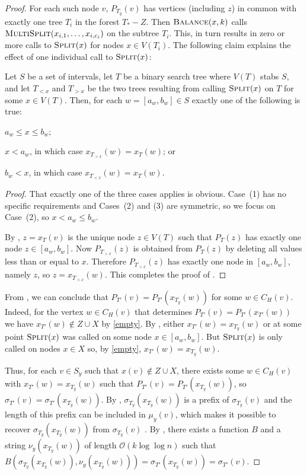 \documentclass[kpfonts]{patmorin}
\newcommand{\Oh}{\mathcal{O}}
\let\le\leqslant
\begin{document}
\begin{proof}
  For each such node $v$, $P_{T_y}(v)$ has vertices (including $z$) in common with exactly one tree $T_{i}$ in the forest $T_*-Z$.  Then $\textsc{Balance}(x,k)$ calls $\textsc{MultiSplit}(x_{i,1},\ldots,x_{i,c_i})$ on the subtree $T_{i}$.  This, in turn results in zero or more calls to $\textsc{Split}(x)$ for nodes $x\in V(T_{i})$. The following claim explains the effect of one individual call to $\textsc{Split}(x)$:

  \begin{clm}
    Let $S$ be a set of intervals, let $T$ be a binary search tree where $V(T)$ stabs $S$, and let $T_{<x}$ and $T_{>x}$ be the two trees resulting from calling $\textsc{Split}(x)$ on $T$ for some $x\in V(T)$.  Then, for each $w=[a_w,b_w]\in S$ exactly one of the following is true:
    \begin{compactenum}
      \item $a_w\le x\le b_w$;
      \item $x< a_w$, in which case $x_{T_{>x}}(w)=x_T(w)$; or
      \item $b_w < x$, in which case $x_{T_{<x}}(w)=x_T(w)$.
    \end{compactenum}
  \end{clm}

  \begin{proof}
    That exactly one of the three cases applies is obvious.  Case~(1) has no specific requirements and Cases~(2) and (3) are symmetric, so we focus on Case~(2), so $x < a_w\le b_w$.

    By , $z=x_T(v)$ is the unique node $z\in V(T)$ such that $P_T(z)$ has exactly one node $z\in [a_w,b_w]$.  Now $P_{T_{>x}}(z)$ is obtained from $P_T(z)$ by deleting all values less than or equal to $x$. Therefore $P_{T_{>x}}(z)$ has exactly one node in $[a_w,b_w]$, namely $z$, so $z=x_{T_{>x}}(w)$.  This completes the proof of .
  \end{proof}

  From , we can conclude that $P_{T'}(v)=P_{T'}(x_{T_y}(w))$ for some $w\in C_H(v)$.  Indeed, for the vertex $w\in C_H(v)$ that determines $P_{T'}(v)=P_{T'}(x_{T'}(w))$ we have $x_{T'}(w)\not\in Z\cup X$ by \eqref{empty}. By , either $x_{T'}(w)=x_{T_y}(w)$ or at some point $\textsc{Split}(x)$ was called on some node $x\in[a_w,b_w]$.  But $\textsc{Split}(x)$ is only called on nodes $x\in X$ so, by \eqref{empty}, $x_{T'}(w)=x_{T_y}(w)$.

  Thus, for each $v\in S_y$ such that $x(v)\not\in Z\cup X$, there exists some $w\in C_H(v)$ with $x_{T'}(w)=x_{T_y}(w)$ such that $P_{T'}(v)=P_{T'}(x_{T_y}(w))$, so $\sigma_{T'}(v)=\sigma_{T'}(x_{T_y}(w))$.  By , $\sigma_{T_y}(x_{T_y}(w))$ is a prefix of $\sigma_{T_y}(v)$ and the length of this prefix can be included in $\mu_y(v)$, which makes it possible to recover $\sigma_{T_y}(x_{T_y}(w))$ from $\sigma_{T_y}(v)$ .  By , there exists a function $B$ and a string $\nu_y(x_{T_y}(w))$ of length $\Oh(k\log\log n)$ such that $B(\sigma_{T_y}(x_{T_y}(w)), \nu_y(x_{T_y}(w))) = \sigma_{T'}(x_{T_y}(w)) = \sigma_{T'}(v)$.


\end{proof}
\end{document}
